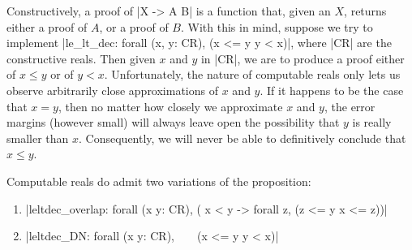 \documentclass[runningheads]{llncs}
\newcommand{\weg}[1]{}
\newcommand{\IR}{{\mathbf R}}
\newcommand{\leltdec}{{\tt leltdec}}
\begin{document}
\weg{ %
A property |P| is {\em stable\/} if $\neg \neg P$ implies |P|.
Classically, this is trivially true, but constructively
not.
}

Constructively, a proof of |X -> A \/ B| is a function that, given an $X$,
returns either a proof of $A$, or a proof of $B$. With this in mind,
suppose we try to implement |le_lt_dec: forall (x, y: CR), (x <= y \/ y < x)|, where |CR| are the constructive reals. Then given $x$ and $y$ in
|CR|, we are to produce a proof either of $x \leq y$ or of $y <
x$. Unfortunately, the nature of computable reals only lets us observe
arbitrarily close approximations of $x$ and $y$. If it happens to be the case that $x =
y$, then no matter how closely we approximate $x$ and $y$, the error
margins (however small) will always leave open the possibility that
$y$ is really smaller than $x$. Consequently, we will never be able to
definitively conclude that $x \leq y$.

Computable reals do admit two variations of the proposition:
\begin{enumerate}
\item |leltdec_overlap: forall (x y: CR), ( x < y -> forall z, (z <= y \/ x <= z))|
\item |leltdec_DN: forall (x y: CR), ~ ~ (x <= y \/ y < x)|
\end{enumerate}
\end{document}
